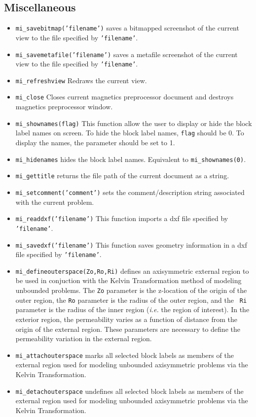 \subsection{Miscellaneous}
\begin{itemize}
\item{\tt mi\_savebitmap('filename')} saves a bitmapped screenshot of the current
view to the file specified by {\tt 'filename'}.
\item{\tt mi\_savemetafile('filename')} saves a metafile screenshot of the current
view to the file specified by {\tt 'filename'}.
\item{\tt mi\_refreshview} Redraws the current view.
\item{\tt mi\_close} Closes current magnetics preprocessor
document and destroys magnetics preprocessor window.
\item{\tt mi\_shownames(flag)} This function allow the user to display or hide the block label
names on screen.  To hide the block label names, {\tt flag} should be 0.  To display the
names, the parameter should be set to 1.
\item{\tt mi\_hidenames} hides the block label names. Equivalent to {\tt mi\_shownames(0)}.

\item{\tt mi\_gettitle} returns the file path of the current document as a string.

\item{\tt mi\_setcomment('comment')} sets the comment/description string associated with the current problem.

\item{\tt mi\_readdxf('filename')} This function imports a dxf file specified by {\tt 'filename'}.
\item{\tt mi\_savedxf('filename')} This function saves geometry information in a dxf file specified by {\tt 'filename'}.
\item{\tt mi\_defineouterspace(Zo,Ro,Ri)} defines
an axisymmetric external region to be used in conjuction with the
Kelvin Transformation method of modeling unbounded problems.  The
{\tt Zo} parameter is the z-location of the origin of the outer region,
the {\tt Ro} parameter is the radius of the outer region, and the {\tt
Ri} parameter is the radius of the inner region ({\em i.e.} the region of
interest). In the exterior region, the permeability varies as a function of
distance from the origin of the external region.  These parameters
are necessary to define the permeability variation in the external
region.
\item{\tt mi\_attachouterspace} marks all
selected block labels as members of the external region used for
modeling unbounded axisymmetric problems via the Kelvin
Transformation.
\item{\tt mi\_detachouterspace} undefines all selected block labels
as members of the external region used for modeling unbounded axisymmetric
problems via the Kelvin Transformation.


\end{itemize}
